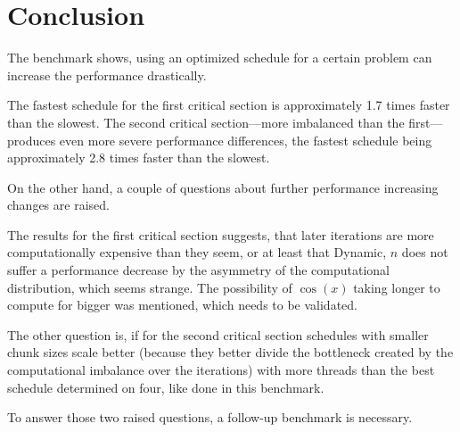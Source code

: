 \documentclass[twoside,11pt]{article}
\begin{document}

\section{Conclusion} %

The benchmark shows, using an optimized schedule for
a certain problem can increase the performance drastically.

The fastest schedule for the first critical section is
approximately 1.7 times faster than the slowest.
The second critical section---more imbalanced than the
first---produces even more severe performance differences,
the fastest schedule being approximately 2.8 times faster
than the slowest.

On the other hand, a couple of questions about further
performance increasing changes are raised.

The results for the first critical section suggests, that
later iterations are more computationally expensive than
they seem, or at least that Dynamic, $n$ does not suffer
a performance decrease by the asymmetry of the
computational distribution, which seems strange.
The possibility of $\cos(x)$ taking longer to compute for
bigger was mentioned, which needs to be validated.

The other question is, if for the second critical section
schedules with smaller chunk sizes scale better (because
they better divide the bottleneck created by the
computational imbalance over the iterations) with more
threads than the best schedule determined on four, like
done in this benchmark.

To answer those two raised questions, a follow-up benchmark
is necessary.



\end{document}
